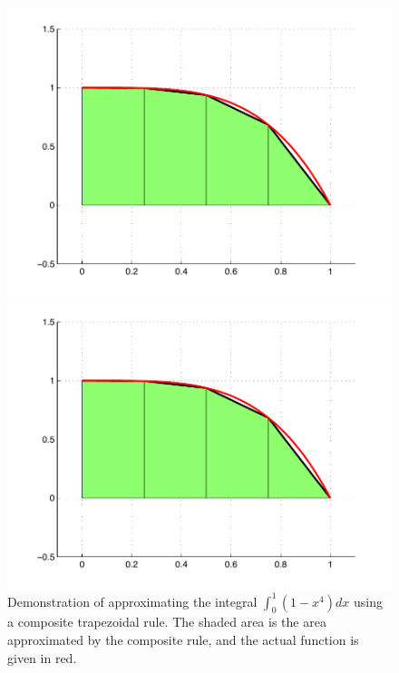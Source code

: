 \begin{figure}
\begin{center}
\begin{matlab}
\includegraphics[scale=.4]{./FiguresMAT/TrapezoidComp.pdf}
\end{matlab}
\begin{python}
\includegraphics[scale=.4]{./FiguresMAT/TrapezoidComp.pdf}
\end{python}
\caption{Demonstration of approximating the integral $\int_0^1 (1-x^4)dx$ using a composite trapezoidal rule. The shaded area is the area approximated by the composite rule, and the actual function is given in red.}
\label{Fig:TrapezoidalComposite}
\end{center}
\end{figure}

